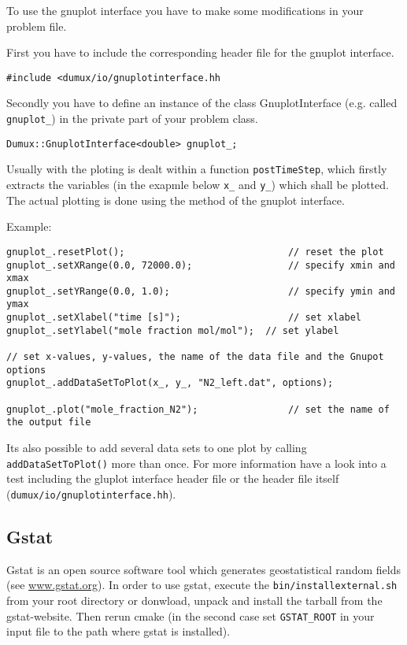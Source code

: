 To use the gnuplot interface you have to make some modifications in your problem file.

First you have to include the corresponding header file for the gnuplot interface. 
\begin{lstlisting}[style=DumuxCode]
#include <dumux/io/gnuplotinterface.hh
\end{lstlisting}

Secondly you have to define an instance of the class GnuplotInterface (e.g. called \texttt{gnuplot\_}) in the private part of your problem class.
\begin{lstlisting}[style=DumuxCode]
Dumux::GnuplotInterface<double> gnuplot_;
\end{lstlisting}

Usually with the ploting is dealt within a function \texttt{postTimeStep}, which firstly extracts the variables (in the exapmle below \texttt{x\_} and \texttt{y\_}) which shall be plotted. The actual plotting is done using the method of the gnuplot interface.

Example:
\begin{lstlisting}[style=DumuxCode]
gnuplot_.resetPlot();                             // reset the plot
gnuplot_.setXRange(0.0, 72000.0);                 // specify xmin and xmax  
gnuplot_.setYRange(0.0, 1.0);                     // specify ymin and ymax
gnuplot_.setXlabel("time [s]");                   // set xlabel
gnuplot_.setYlabel("mole fraction mol/mol");  // set ylabel

// set x-values, y-values, the name of the data file and the Gnupot options
gnuplot_.addDataSetToPlot(x_, y_, "N2_left.dat", options); 

gnuplot_.plot("mole_fraction_N2");                // set the name of the output file
\end{lstlisting}

Its also possible to add several data sets to one plot by calling \texttt{addDataSetToPlot()} more than once.
For more information have a look into a test including the gluplot interface header file or
the header file itself (\texttt{dumux/io/gnuplotinterface.hh}).


\subsection{Gstat}
Gstat is an open source software tool which generates geostatistical random fields (see \url{www.gstat.org}).
In order to use gstat, execute the \texttt{bin/installexternal.sh} from your \Dumux root
directory or donwload, unpack and install the tarball from the gstat-website.
Then rerun cmake (in the second case set \texttt{GSTAT\_ROOT} in your input file to the
path where gstat is installed).


